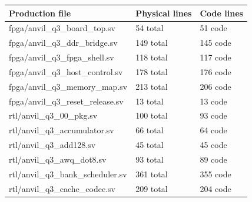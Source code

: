 \documentclass[11pt,a4paper]{article}
\begin{document}
{\small\renewcommand{\arraystretch}{1.18}\begin{longtable}{@{}L{0.55\textwidth}|L{0.18\textwidth}|L{0.18\textwidth}@{}}\toprule

\textbf{Production file} & \textbf{Physical lines} & \textbf{Code lines}\\\midrule\endhead

fpga/\allowbreak{}anvil\_\allowbreak{}q3\_\allowbreak{}board\_\allowbreak{}top.sv & 54 total & 51 code\\[2pt]\hline

fpga/\allowbreak{}anvil\_\allowbreak{}q3\_\allowbreak{}ddr\_\allowbreak{}bridge.sv & 149 total & 145 code\\[2pt]\hline

fpga/\allowbreak{}anvil\_\allowbreak{}q3\_\allowbreak{}fpga\_\allowbreak{}shell.sv & 118 total & 117 code\\[2pt]\hline

fpga/\allowbreak{}anvil\_\allowbreak{}q3\_\allowbreak{}host\_\allowbreak{}control.sv & 178 total & 176 code\\[2pt]\hline

fpga/\allowbreak{}anvil\_\allowbreak{}q3\_\allowbreak{}memory\_\allowbreak{}map.sv & 213 total & 206 code\\[2pt]\hline

fpga/\allowbreak{}anvil\_\allowbreak{}q3\_\allowbreak{}reset\_\allowbreak{}release.sv & 13 total & 13 code\\[2pt]\hline

rtl/\allowbreak{}anvil\_\allowbreak{}q3\_\allowbreak{}00\_\allowbreak{}pkg.sv & 100 total & 93 code\\[2pt]\hline

rtl/\allowbreak{}anvil\_\allowbreak{}q3\_\allowbreak{}accumulator.sv & 66 total & 64 code\\[2pt]\hline

rtl/\allowbreak{}anvil\_\allowbreak{}q3\_\allowbreak{}add128.sv & 45 total & 45 code\\[2pt]\hline

rtl/\allowbreak{}anvil\_\allowbreak{}q3\_\allowbreak{}awq\_\allowbreak{}dot8.sv & 93 total & 89 code\\[2pt]\hline

rtl/\allowbreak{}anvil\_\allowbreak{}q3\_\allowbreak{}bank\_\allowbreak{}scheduler.sv & 361 total & 355 code\\[2pt]\hline

rtl/\allowbreak{}anvil\_\allowbreak{}q3\_\allowbreak{}cache\_\allowbreak{}codec.sv & 209 total & 204 code\\[2pt]\hline


\end{longtable}}
\end{document}
